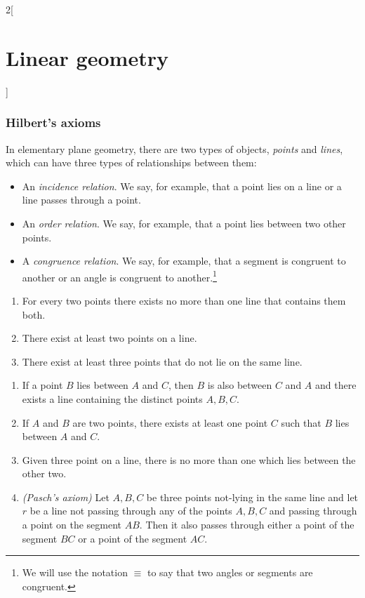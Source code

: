 \documentclass[class=article,10pt,crop=false]{standalone}
\begin{document}
\begin{multicols}{2}[\section{Linear geometry}]
\subsubsection*{Hilbert's axioms}
\begin{definition}
In elementary plane geometry, there are two types of objects, \textit{points} and \textit{lines}, which can have three types of relationships between them:
\begin{itemize}
    \item An \textit{incidence relation}. We say, for example, that a point lies on a line or a line passes through a point.
    \item An \textit{order relation}. We say, for example, that a point lies between two other points.
    \item A \textit{congruence relation}. We say, for example, that a segment is congruent to another or an angle is congruent to another.\footnote{We will use the notation $\equiv$ to say that two angles or segments are congruent.}
\end{itemize}
\end{definition}
\begin{axiom}
\label{1}
\hfill
\begin{enumerate}
    \item For every two points there exists no more than one line that contains them both.
    \item There exist at least two points on a line.
    \item There exist at least three points that do not lie on the same line.
\end{enumerate}
\end{axiom}
\begin{axiom}
\label{2}
\hfill
\begin{enumerate}
    \item If a point $B$ lies between $A$ and $C$, then $B$ is also between $C$ and $A$ and there exists a line containing the distinct points $A,B,C$.
    \item If $A$ and $B$ are two points, there exists at least one point $C$ such that $B$ lies between $A$ and $C$.
    \item Given three point on a line, there is no more than one which lies between the other two.
    \item \textit{(Pasch's axiom)} Let $A,B,C$ be three points not-lying in the same line and let $r$ be a line not passing through any of the points $A,B,C$ and passing through a point on the segment $AB$. Then it also passes through either a point of the segment $BC$ or a point of the segment $AC$.

\end{enumerate}
\end{axiom}
\end{multicols}
\end{document}

